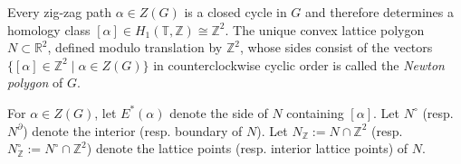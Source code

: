 \documentclass[12pt]{amsart}
\numberwithin{equation}{section}
\theoremstyle{definition}
\newcommand{\Z}{\mathbb{Z}}
\newcommand{\R}{\mathbb{R}}
\def\Gtor{G}
\def\torus{\mathbb{T}}
\def\zzG{{{Z}(G)}}
\def\NZ{N_{\Z}}
\def\No{N^\circ}
\def\NZo{N^\circ_{\Z}}
\def\Nbd{N^\partial}
\begin{document}
Every zig-zag path $\alpha \in \zzG$ is a closed cycle in $\Gtor$ and therefore determines a homology class $[\alpha] \in H_1(\torus,\Z) \cong \Z^2$. The
unique convex lattice polygon $N \subset \R^2$, defined modulo translation by $\Z^2$, whose sides consist of the
vectors $\{[\alpha] \in \Z^2 \mid \alpha \in \zzG\}$ in counterclockwise cyclic order is called the \emph{Newton polygon}
of $\Gtor$. 


For $\alpha \in \zzG$, let $E^*(\alpha)$ denote the side of $N$ containing $[\alpha]$. Let $\No$ (resp. $\Nbd$) denote the interior (resp. boundary of $N$). Let $\NZ:=N \cap \Z^2$ (resp. $\NZo:= N^\circ \cap \Z^2$) denote the lattice points (resp. interior lattice points) of $N$.

\end{document}
